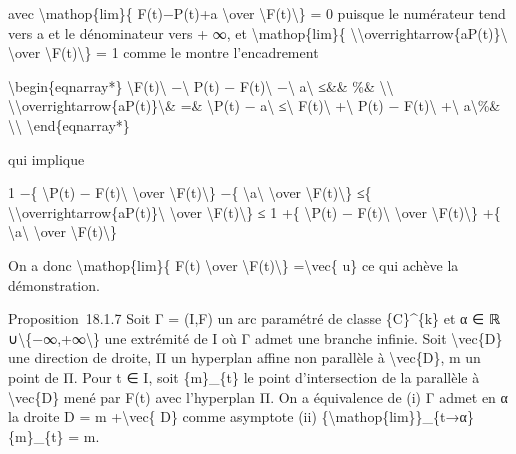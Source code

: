 \documentclass[]{article}
\begin{document}
avec \textbackslash{}mathop\{lim\}\{ F(t)−P(t)+a \textbackslash{}over
\textbackslash{}\textbar{}F(t)\textbackslash{}\textbar{}\} = 0 puisque
le numérateur tend vers a et le dénominateur vers + ∞, et
\textbackslash{}mathop\{lim\}\{
\textbackslash{}\textbar{}\textbackslash{}overrightarrow\{aP(t)\}\textbackslash{}\textbar{}
\textbackslash{}over
\textbackslash{}\textbar{}F(t)\textbackslash{}\textbar{}\} = 1 comme le
montre l'encadrement

\textbackslash{}begin\{eqnarray*\}
\textbackslash{}\textbar{}F(t)\textbackslash{}\textbar{}
−\textbackslash{}\textbar{} P(t) − F(t)\textbackslash{}\textbar{}
−\textbackslash{}\textbar{} a\textbackslash{}\textbar{} ≤\&\& \%\&
\textbackslash{}\textbackslash{}
\textbackslash{}\textbar{}\textbackslash{}overrightarrow\{aP(t)\}\textbackslash{}\textbar{}\&
=\& \textbackslash{}\textbar{}P(t) − a\textbackslash{}\textbar{}
≤\textbackslash{}\textbar{} F(t)\textbackslash{}\textbar{}
+\textbackslash{}\textbar{} P(t) − F(t)\textbackslash{}\textbar{}
+\textbackslash{}\textbar{} a\textbackslash{}\textbar{}\%\&
\textbackslash{}\textbackslash{} \textbackslash{}end\{eqnarray*\}

qui implique

1 −\{ \textbackslash{}\textbar{}P(t) − F(t)\textbackslash{}\textbar{}
\textbackslash{}over
\textbackslash{}\textbar{}F(t)\textbackslash{}\textbar{}\} −\{
\textbackslash{}\textbar{}a\textbackslash{}\textbar{}
\textbackslash{}over
\textbackslash{}\textbar{}F(t)\textbackslash{}\textbar{}\} ≤\{
\textbackslash{}\textbar{}\textbackslash{}overrightarrow\{aP(t)\}\textbackslash{}\textbar{}
\textbackslash{}over
\textbackslash{}\textbar{}F(t)\textbackslash{}\textbar{}\} ≤ 1 +\{
\textbackslash{}\textbar{}P(t) − F(t)\textbackslash{}\textbar{}
\textbackslash{}over
\textbackslash{}\textbar{}F(t)\textbackslash{}\textbar{}\} +\{
\textbackslash{}\textbar{}a\textbackslash{}\textbar{}
\textbackslash{}over
\textbackslash{}\textbar{}F(t)\textbackslash{}\textbar{}\}

On a donc \textbackslash{}mathop\{lim\}\{ F(t) \textbackslash{}over
\textbackslash{}\textbar{}F(t)\textbackslash{}\textbar{}\}
=\textbackslash{}vec\{ u\} ce qui achève la démonstration.

Proposition~18.1.7 Soit Γ = (I,F) un arc paramétré de classe
\{C\}\^{}\{k\} et α ∈ ℝ ∪\textbackslash{}\{−∞,+∞\textbackslash{}\} une
extrémité de I où Γ admet une branche infinie. Soit
\textbackslash{}vec\{D\} une direction de droite, Π un hyperplan affine
non parallèle à \textbackslash{}vec\{D\}, m un point de Π. Pour t ∈ I,
soit \{m\}\_\{t\} le point d'intersection de la parallèle à
\textbackslash{}vec\{D\} mené par F(t) avec l'hyperplan Π. On a
équivalence de (i) Γ admet en α la droite D = m +\textbackslash{}vec\{
D\} comme asymptote (ii)
\{\textbackslash{}mathop\{lim\}\}\_\{t→α\}\{m\}\_\{t\} = m.
\end{document}

